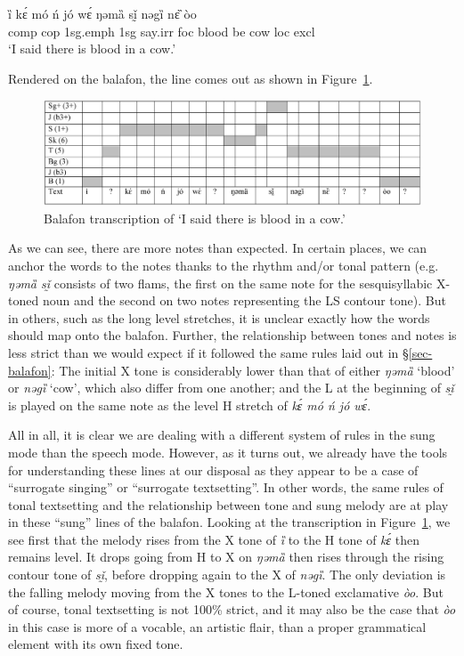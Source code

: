 \documentclass[output=paper]{langscibook}
\begin{document}
\ea\label{blood} 
\gll ȉ kɛ́ mó ń jó wɛ́ ŋəmȁ sḭ̌ nəgȉ nɛ̏ òo \\
{\sc comp} {\sc cop} {\sc 1sg.emph} {\sc 1sg} say.{\sc irr} {\sc foc} blood be cow {\sc loc} {\sc excl} \\
\glt `I said there is blood in a cow.' \\
\z 

Rendered on the balafon, the line comes out as shown in Figure~\ref{blood-balafon}. 

\begin{figure}
  \includegraphics[scale=.4, angle=90]{figures/gbene-gosera-so-balafon.eps}
  \caption{Balafon transcription of `I said there is blood in a cow.'}\label{blood-balafon} 
\end{figure} 

As we can see, there are more notes than expected. In certain places, we can anchor the words to the notes thanks to the rhythm and/or tonal pattern (e.g. \textit{ŋəmȁ sḭ̌} consists of two flams, the first on the same note for the sesquisyllabic X-toned noun and the second on two notes representing the LS contour tone). But in others, such as the long level stretches, it is unclear exactly how the words should map onto the balafon. Further, the relationship between tones and notes is less strict than we would expect if it followed the same rules laid out in \S\ref{sec-balafon}: The initial X tone is considerably lower than that of either \textit{ŋəmȁ} `blood' or \textit{nəgȉ} `cow', which also differ from one another; and the L at the beginning of \textit{sḭ̌} is played on the same note as the level H stretch of \textit{kɛ́ mó ń jó wɛ́}. 

All in all, it is clear we are dealing with a different system of rules in the sung mode than the speech mode. However, as it turns out, we already have the tools for understanding these lines at our disposal as they appear to be a case of ``surrogate singing'' or ``surrogate textsetting''. In other words, the same rules of tonal textsetting and the relationship between tone and sung melody are at play in these ``sung'' lines of the balafon. Looking at the transcription in Figure~\ref{blood-balafon}, we see first that the melody rises from the X tone of \textit{ȉ} to the H tone of \textit{kɛ́} then remains level. It drops going from H to X on \textit{ŋəmȁ} then rises through the rising contour tone of \textit{sḭ̌}, before dropping again to the X of \textit{nəgȉ}. The only deviation is the falling melody moving from the X tones to the L-toned exclamative \textit{òo}. But of course, tonal textsetting is not 100\% strict, and it may also be the case that \textit{òo} in this case is more of a vocable, an artistic flair, than a proper grammatical element with its own fixed tone. 
\end{document}
